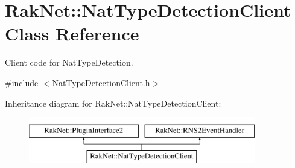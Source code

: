 \hypertarget{class_rak_net_1_1_nat_type_detection_client}{\section{Rak\-Net\-:\-:Nat\-Type\-Detection\-Client Class Reference}
\label{class_rak_net_1_1_nat_type_detection_client}
}


Client code for Nat\-Type\-Detection.  




{\ttfamily \#include $<$Nat\-Type\-Detection\-Client.\-h$>$}

Inheritance diagram for Rak\-Net\-:\-:Nat\-Type\-Detection\-Client\-:\begin{figure}[H]
\begin{center}
\leavevmode
\includegraphics[height=2.000000cm]{class_rak_net_1_1_nat_type_detection_client}
\end{center}
\end{figure}
